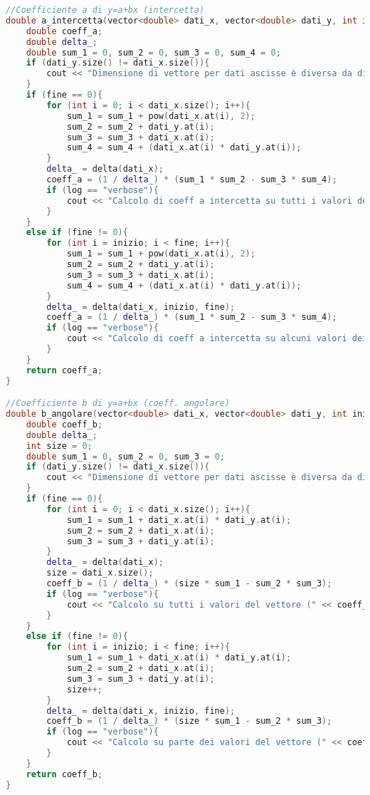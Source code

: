 \documentclass[a4paper,11pt,oneside]{article}
\begin{document}
\begin{lstlisting}[language=C++, label=lst:statistica.h, caption=statistica.h]
//Coefficiente a di y=a+bx (intercetta)
double a_intercetta(vector<double> dati_x, vector<double> dati_y, int inizio = 0, int fine = 0, string log = ""){
    double coeff_a;
    double delta_;
    double sum_1 = 0, sum_2 = 0, sum_3 = 0, sum_4 = 0;
    if (dati_y.size() != dati_x.size()){
        cout << "Dimensione di vettore per dati ascisse è diversa da dimensione vettore dati ordinate" << endl;
    }
    if (fine == 0){
        for (int i = 0; i < dati_x.size(); i++){
            sum_1 = sum_1 + pow(dati_x.at(i), 2);
            sum_2 = sum_2 + dati_y.at(i);
            sum_3 = sum_3 + dati_x.at(i);
            sum_4 = sum_4 + (dati_x.at(i) * dati_y.at(i));
        }
        delta_ = delta(dati_x);
        coeff_a = (1 / delta_) * (sum_1 * sum_2 - sum_3 * sum_4);
        if (log == "verbose"){
            cout << "Calcolo di coeff a intercetta su tutti i valori dei vettori forniti (" << coeff_a << ")" << endl;
        }
    }
    else if (fine != 0){
        for (int i = inizio; i < fine; i++){
            sum_1 = sum_1 + pow(dati_x.at(i), 2);
            sum_2 = sum_2 + dati_y.at(i);
            sum_3 = sum_3 + dati_x.at(i);
            sum_4 = sum_4 + (dati_x.at(i) * dati_y.at(i));
        }
        delta_ = delta(dati_x, inizio, fine);
        coeff_a = (1 / delta_) * (sum_1 * sum_2 - sum_3 * sum_4);
        if (log == "verbose"){
            cout << "Calcolo di coeff a intercetta su alcuni valori dei vettori forniti (" << coeff_a << ")" << endl;
        }
    }
    return coeff_a;
}

//Coefficiente b di y=a+bx (coeff. angolare)
double b_angolare(vector<double> dati_x, vector<double> dati_y, int inizio = 0, int fine = 0, string log = ""){
    double coeff_b;
    double delta_;
    int size = 0;
    double sum_1 = 0, sum_2 = 0, sum_3 = 0;
    if (dati_y.size() != dati_x.size()){
        cout << "Dimensione di vettore per dati ascisse è diversa da dimensione vettore dati ordinate";
    }
    if (fine == 0){
        for (int i = 0; i < dati_x.size(); i++){
            sum_1 = sum_1 + dati_x.at(i) * dati_y.at(i);
            sum_2 = sum_2 + dati_x.at(i);
            sum_3 = sum_3 + dati_y.at(i);
        }
        delta_ = delta(dati_x);
        size = dati_x.size();
        coeff_b = (1 / delta_) * (size * sum_1 - sum_2 * sum_3);
        if (log == "verbose"){
            cout << "Calcolo su tutti i valori del vettore (" << coeff_b << ")" << endl;
        }
    }
    else if (fine != 0){
        for (int i = inizio; i < fine; i++){
            sum_1 = sum_1 + dati_x.at(i) * dati_y.at(i);
            sum_2 = sum_2 + dati_x.at(i);
            sum_3 = sum_3 + dati_y.at(i);
            size++;
        }
        delta_ = delta(dati_x, inizio, fine);
        coeff_b = (1 / delta_) * (size * sum_1 - sum_2 * sum_3);
        if (log == "verbose"){
            cout << "Calcolo su parte dei valori del vettore (" << coeff_b << ")" << endl;
        }
    }
    return coeff_b;
}


\end{lstlisting}
\end{document}
